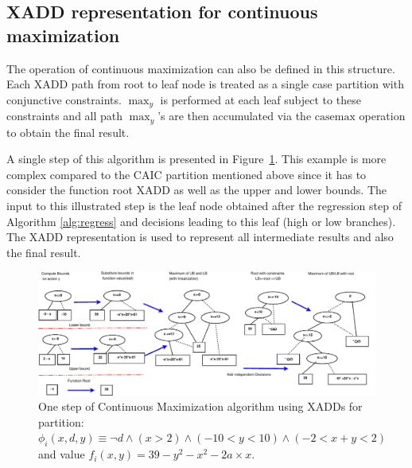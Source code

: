 \documentclass[twoside,11pt]{article}
\newcommand{\casemax}{\mathrm{casemax}}
\begin{document}
\subsection{XADD representation for continuous maximization}

The operation of continuous maximization can also be defined in this structure.
Each XADD path from root to
leaf node is treated as a single case partition with conjunctive constraints.  
$\max_y$ is performed at each leaf subject to these constraints
and all path $\max_y$'s are then accumulated via the $\casemax$
operation to obtain the final result.

A single step of this algorithm is presented in Figure~\ref{fig:xadd_max}. This example is more complex compared to the CAIC partition mentioned above since it has to consider the function root XADD as well as the upper and lower bounds. The input to this illustrated step is the leaf node obtained after the regression step of Algorithm \ref{alg:regress} and decisions leading to this leaf (high or low branches).  The XADD representation is used to represent all intermediate results and also the final result. 
\begin{figure}[t!]
\includegraphics[width=0.97 \textwidth]{pics/maximum_cont_action4.pdf}

\caption{%
One step of Continuous Maximization algorithm using XADDs for partition:
$\phi_i ( x,d,y ) \equiv \neg d \wedge ( x>2 ) \wedge ( -10 < y < 10) \wedge ( -2 < x+y < 2 )$  
and value $f_i ( x,y ) = 39- y^2 -x^2 - 2a \times x$.}
\label{fig:xadd_max}
\end{figure}
\end{document}
